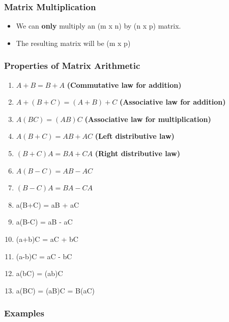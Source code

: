 \documentclass[
  letterpaper,
  DIV=11,
  numbers=noendperiod]{scrartcl}
\providecommand{\tightlist}{%
  \setlength{\itemsep}{0pt}\setlength{\parskip}{0pt}}\usepackage{longtable,booktabs,array}
\begin{document}
\subsubsection{Matrix Multiplication}\label{matrix-multiplication}

\begin{itemize}
\tightlist
\item
  We can \textbf{only} multiply an (m x n) by (n x p) matrix.
\item
  The resulting matrix will be (m x p)
\end{itemize}

\subsubsection{Properties of Matrix
Arithmetic}\label{properties-of-matrix-arithmetic}

\begin{enumerate}
\def\labelenumi{(\alph{enumi})}
\tightlist
\item
  \(A + B = B + A\) \textbf{(Commutative law for addition)}
\item
  \(A + (B + C) = (A + B) + C\) \textbf{(Associative law for addition)}
\item
  \(A(BC) = (AB)C\) \textbf{(Associative law for multiplication)}
\item
  \(A(B+C) = AB + AC\) \textbf{(Left distributive law)}
\item
  \((B+C)A = BA + CA\) \textbf{(Right distributive law)}
\item
  \(A(B-C) = AB - AC\)
\item
  \((B-C)A = BA - CA\)
\item
  a(B+C) = aB + aC
\item
  a(B-C) = aB - aC
\item
  (a+b)C = aC + bC
\item
  (a-b)C = aC - bC
\item
  a(bC) = (ab)C
\item
  a(BC) = (aB)C = B(aC)
\end{enumerate}

\subsubsection{Examples}\label{examples}
\end{document}
